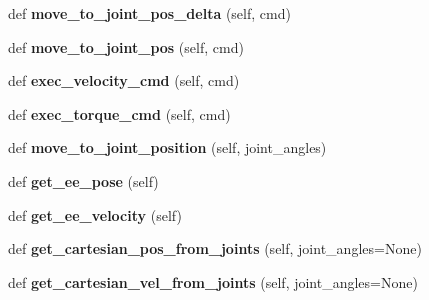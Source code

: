 \begin{DoxyCompactItemize}
\hypertarget{classaml__robot_1_1baxter__robot_1_1_baxter_arm_ad4c0f6a22d0cb23f411d50e8f661bcbb}{}\label{classaml__robot_1_1baxter__robot_1_1_baxter_arm_ad4c0f6a22d0cb23f411d50e8f661bcbb} 
def {\bfseries move\+\_\+to\+\_\+joint\+\_\+pos\+\_\+delta} (self, cmd)
\item 
\hypertarget{classaml__robot_1_1baxter__robot_1_1_baxter_arm_a93f87a8500f9e0bfce6be75e41e3ac17}{}\label{classaml__robot_1_1baxter__robot_1_1_baxter_arm_a93f87a8500f9e0bfce6be75e41e3ac17} 
def {\bfseries move\+\_\+to\+\_\+joint\+\_\+pos} (self, cmd)
\item 
\hypertarget{classaml__robot_1_1baxter__robot_1_1_baxter_arm_a3b5cb3d6c651c72bfe9ffd80c867f8f7}{}\label{classaml__robot_1_1baxter__robot_1_1_baxter_arm_a3b5cb3d6c651c72bfe9ffd80c867f8f7} 
def {\bfseries exec\+\_\+velocity\+\_\+cmd} (self, cmd)
\item 
\hypertarget{classaml__robot_1_1baxter__robot_1_1_baxter_arm_aed8c9accc1f637677e4d64583b63d107}{}\label{classaml__robot_1_1baxter__robot_1_1_baxter_arm_aed8c9accc1f637677e4d64583b63d107} 
def {\bfseries exec\+\_\+torque\+\_\+cmd} (self, cmd)
\item 
\hypertarget{classaml__robot_1_1baxter__robot_1_1_baxter_arm_afddcdfa0cafe258cf7f432e7878bc687}{}\label{classaml__robot_1_1baxter__robot_1_1_baxter_arm_afddcdfa0cafe258cf7f432e7878bc687} 
def {\bfseries move\+\_\+to\+\_\+joint\+\_\+position} (self, joint\+\_\+angles)
\item 
\hypertarget{classaml__robot_1_1baxter__robot_1_1_baxter_arm_ac353cdab96098923a40efd30f17f4e7a}{}\label{classaml__robot_1_1baxter__robot_1_1_baxter_arm_ac353cdab96098923a40efd30f17f4e7a} 
def {\bfseries get\+\_\+ee\+\_\+pose} (self)
\item 
\hypertarget{classaml__robot_1_1baxter__robot_1_1_baxter_arm_ab6c7fe72a54012c2081f943d378096b0}{}\label{classaml__robot_1_1baxter__robot_1_1_baxter_arm_ab6c7fe72a54012c2081f943d378096b0} 
def {\bfseries get\+\_\+ee\+\_\+velocity} (self)
\item 
\hypertarget{classaml__robot_1_1baxter__robot_1_1_baxter_arm_a9ce9c74c445092b5f9bd26793366c8de}{}\label{classaml__robot_1_1baxter__robot_1_1_baxter_arm_a9ce9c74c445092b5f9bd26793366c8de} 
def {\bfseries get\+\_\+cartesian\+\_\+pos\+\_\+from\+\_\+joints} (self, joint\+\_\+angles=None)
\item 
\hypertarget{classaml__robot_1_1baxter__robot_1_1_baxter_arm_a5d42a91ca13fc1776997909afb999d8f}{}\label{classaml__robot_1_1baxter__robot_1_1_baxter_arm_a5d42a91ca13fc1776997909afb999d8f} 
def {\bfseries get\+\_\+cartesian\+\_\+vel\+\_\+from\+\_\+joints} (self, joint\+\_\+angles=None)

\end{DoxyCompactItemize}
